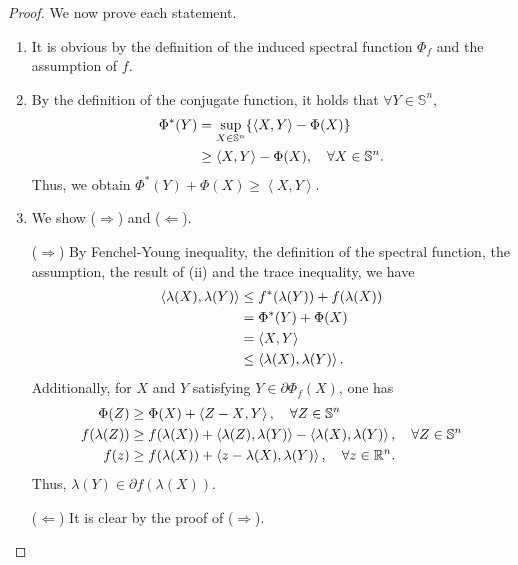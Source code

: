\documentclass[a4paper,11pt, oneside]{book}
\theoremstyle{definition}
\newcommand{\NDemenstionalRealEuclideanSpace}{\mathbb{R}^n}
\newcommand{\NDemenstionalRealSymmetricMatrixSpace}{\mathbb{S}^n}
\newcommand{\InnerProduct}[2]{\left\langle {#1},{#2}\right\rangle} %
\newcommand{\ConjugateFunction}[1]{{#1}^*}
\begin{document}
\begin{proof}
  We now prove each statement.
  \begin{enumerate}[label=\roman*,align=CenterWithParen]
    \item It is obvious by the definition of the induced spectral function $\Phi_f$ and the assumption of $f$.
    \item By the definition of the conjugate function, it holds that $\forall Y \in \NDemenstionalRealSymmetricMatrixSpace$,
    \begin{equation}
      \begin{split}
        \ConjugateFunction{\Phi}(Y) &= \sup_{X \in \NDemenstionalRealSymmetricMatrixSpace} \{\InnerProduct{X}{Y} - \Phi(X)\} \\
        &\geq \InnerProduct{X}{Y} - \Phi(X), \quad \forall X \in \NDemenstionalRealSymmetricMatrixSpace. \notag
      \end{split}
    \end{equation}
    Thus, we obtain $\ConjugateFunction{\Phi}(Y) + \Phi(X) \geq \InnerProduct{X}{Y}$.
    \item We show ($\Rightarrow$) and ($\Leftarrow$).

    ($\Rightarrow$) By Fenchel-Young inequality, the definition of the spectral function, the assumption, the result of (ii) and the trace inequality, we have
    \begin{equation}
      \begin{split}
        \InnerProduct{\lambda(X)}{\lambda(Y)} &\leq \ConjugateFunction{f}(\lambda(Y)) + f(\lambda(X)) \\
        &= \ConjugateFunction{\Phi}(Y) + \Phi(X) \\
        &= \InnerProduct{X}{Y} \\
        &\leq \InnerProduct{\lambda(X)}{\lambda(Y)}. \notag
      \end{split}
    \end{equation}
    Additionally, for $X$ and $Y$ satisfying $Y \in \partial \Phi_f(X)$, one has
    \begin{equation}
      \begin{split}
        \Phi(Z) &\geq \Phi(X) + \InnerProduct{Z-X}{Y}, \quad \forall Z \in \NDemenstionalRealSymmetricMatrixSpace \\
        f(\lambda(Z)) &\geq f(\lambda(X)) + \InnerProduct{\lambda(Z)}{\lambda(Y)} - \InnerProduct{\lambda(X)}{\lambda(Y)}, \quad \forall Z \in \NDemenstionalRealSymmetricMatrixSpace\\
        f(z) &\geq f(\lambda(X)) + \InnerProduct{z - \lambda(X)}{\lambda(Y)}, \quad \forall z \in \NDemenstionalRealEuclideanSpace. \notag
      \end{split}
    \end{equation}
    Thus, $\lambda(Y) \in \partial f(\lambda(X))$.

    ($\Leftarrow$) It is clear by the proof of ($\Rightarrow$).
  \end{enumerate}
\end{proof}
\end{document}
